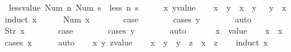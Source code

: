 \begin{isabellebody}
\ \ {\isachardoublequoteopen}less{\isacharunderscore}value\ {\isacharparenleft}Num\ n{\isacharparenright}\ {\isacharparenleft}Num\ s{\isacharparenright}\ {\isacharequal}\ less\ n\ s{\isachardoublequoteclose}\isanewline
\isanewline
{}\isamarkupfalse%
%
\isadelimproof
\ %
\endisadelimproof
%
\isatagproof
{}\isamarkupfalse%
\isanewline
\ \ \isamarkupfalse%
\ x\ y{\isacharcolon}{\isacharcolon}{\isachardoublequoteopen}value{\isachardoublequoteclose}\isanewline
\ \ \isamarkupfalse%
\ {\isachardoublequoteopen}{\isacharparenleft}x\ {\isacharless}\ y{\isacharparenright}\ {\isacharequal}\ {\isacharparenleft}x\ {\isasymle}\ y\ {\isasymand}\ {\isasymnot}\ y\ {\isasymle}\ x{\isacharparenright}{\isachardoublequoteclose}\isanewline
\ \ \isamarkupfalse%
\ {\isacharparenleft}induct\ x{\isacharparenright}\isanewline
\ \ \ \ \isamarkupfalse%
\ {\isacharparenleft}Num\ x{\isacharparenright}\isanewline
\ \ \ \ \isamarkupfalse%
\ \isamarkupfalse%
\ {\isacharquery}case\isanewline
\ \ \ \ \ \ \isamarkupfalse%
\ {\isacharparenleft}cases\ y{\isacharparenright}\isanewline
\ \ \ \ \ \ \isamarkupfalse%
\ auto\isanewline
\ \ \isamarkupfalse%
\isanewline
\ \ \ \ \isamarkupfalse%
\ {\isacharparenleft}Str\ x{\isacharparenright}\isanewline
\ \ \ \ \isamarkupfalse%
\ \isamarkupfalse%
\ {\isacharquery}case\isanewline
\ \ \ \ \ \ \isamarkupfalse%
\ {\isacharparenleft}cases\ y{\isacharparenright}\isanewline
\ \ \ \ \ \ \isamarkupfalse%
\ auto\isanewline
\ \ \isamarkupfalse%
\isanewline
\ \ \isamarkupfalse%
\ x\ {\isacharcolon}{\isacharcolon}\ {\isachardoublequoteopen}value{\isachardoublequoteclose}\isanewline
\ \ \isamarkupfalse%
\ {\isachardoublequoteopen}x\ {\isasymle}\ x{\isachardoublequoteclose}\isanewline
\ \ \ \ \isamarkupfalse%
\ {\isacharparenleft}cases\ x{\isacharparenright}\isanewline
\ \ \ \ \isamarkupfalse%
\ auto\isanewline
\ \ \isamarkupfalse%
\ x\ y\ z{\isacharcolon}{\isacharcolon}{\isachardoublequoteopen}value{\isachardoublequoteclose}\isanewline
\ \ \isamarkupfalse%
\ {\isachardoublequoteopen}x\ {\isasymle}\ y\ {\isasymLongrightarrow}\ y\ {\isasymle}\ z\ {\isasymLongrightarrow}\ x\ {\isasymle}\ z{\isachardoublequoteclose}\isanewline
\ \ \isamarkupfalse%
\ {\isacharparenleft}induct\ x{\isacharparenright}\isanewline

\end{isabellebody}
